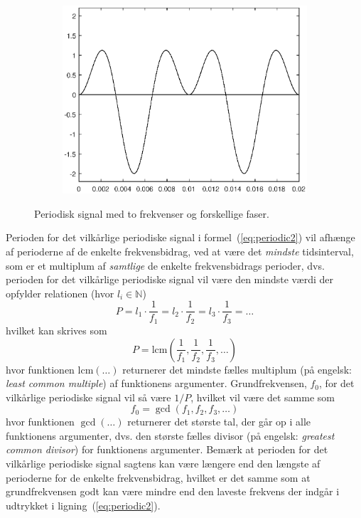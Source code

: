 \documentclass[11pt,a4paper]{article}
\begin{document}
\begin{figure}[htbp]
\begin{subfigure}{0.48\textwidth}
\end{subfigure}
\begin{subfigure}{0.48\textwidth}
\includegraphics[scale=0.5]{phase_180}
\end{subfigure}
\caption{\label{fig:phaseillustration}Periodisk signal med to frekvenser og forskellige faser.}
\end{figure}

Perioden for det vilkårlige periodiske signal i formel~(\ref{eq:periodic2}) vil afhænge af perioderne af de enkelte frekvensbidrag, ved at være det \emph{mindste} tidsinterval, som er et multiplum af \emph{samtlige} de enkelte frekvensbidrags perioder, dvs. perioden for det vilkårlige periodiske signal vil være den mindste værdi der opfylder relationen (hvor $l_{i}\in\mathbb{N}$)
\begin{equation}
P=l_{1}\cdot\frac{1}{f_{1}}=l_{2}\cdot\frac{1}{f_{2}}=l_{3}\cdot\frac{1}{f_{3}}=\ldots
\end{equation}
\noindent{}hvilket kan skrives som
\begin{equation}
P=\textrm{lcm}\left(\frac{1}{f_{1}}, \frac{1}{f_{2}}, \frac{1}{f_{3}}, \ldots\right)
\end{equation}
hvor funktionen $\textrm{lcm}(\ldots)$ returnerer det mindste fælles multiplum (på engelsk: \emph{least common multiple}) af funktionens argumenter. Grundfrekvensen, $f_{0}$, for det vilkårlige periodiske signal vil så være $1/P$, hvilket vil være det samme som
\begin{equation}
f_{0}=\gcd\left(f_{1},f_{2},f_{3},\ldots\right)
\end{equation}
hvor funktionen $\gcd(\ldots)$ returnerer det største tal, der går op i alle funktionens argumenter, dvs. den største fælles divisor (på engelsk: \emph{greatest common divisor}) for funktionens argumenter. Bemærk at perioden for det vilkårlige periodiske signal sagtens kan være længere end den længste af perioderne for de enkelte frekvensbidrag, hvilket er det samme som at grundfrekvensen godt kan være mindre end den laveste frekvens der indgår i udtrykket i ligning~(\ref{eq:periodic2}).
\end{document}
